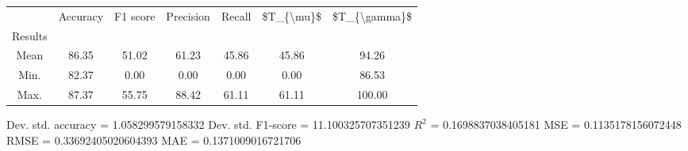 \begin{tabular}{|c|c|c|c|c|c|c|}
\toprule
{} &  Accuracy &  F1 score &  Precision &  Recall &  \$T\_\{\textbackslash mu\}\$ &  \$T\_\{\textbackslash gamma\}\$ \\
Results &           &           &            &         &            &               \\
\hline
Mean    &     86.35 &     51.02 &      61.23 &   45.86 &      45.86 &         94.26 \\
Min.    &     82.37 &      0.00 &       0.00 &    0.00 &       0.00 &         86.53 \\
Max.    &     87.37 &     55.75 &      88.42 &   61.11 &      61.11 &        100.00 \\
\bottomrule
\end{tabular}

 Dev. std. accuracy = 1.058299579158332
 Dev. std. F1-score = 11.100325707351239
 $R^2$ = 0.1698837038405181
 MSE = 0.1135178156072448
 RMSE = 0.33692405020604393
 MAE = 0.1371009016721706